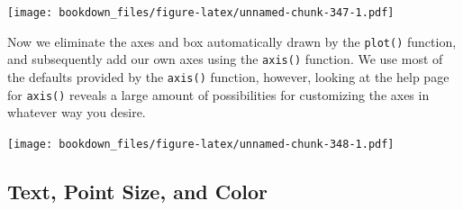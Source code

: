 \documentclass[
]{krantz}
\makeatletter
\newenvironment{Shaded}{\begin{snugshade}}{\end{snugshade}}
\newcommand{\DataTypeTok}[1]{\textcolor[rgb]{0.27,0.27,0.27}{#1}}
\newcommand{\DecValTok}[1]{\textcolor[rgb]{0.06,0.06,0.06}{#1}}
\newcommand{\KeywordTok}[1]{\textcolor[rgb]{0.27,0.27,0.27}{\textbf{#1}}}
\newcommand{\NormalTok}[1]{#1}
\newcommand{\OperatorTok}[1]{\textcolor[rgb]{0.43,0.43,0.43}{\textbf{#1}}}
\newcommand{\OtherTok}[1]{\textcolor[rgb]{0.37,0.37,0.37}{#1}}
\newcommand{\StringTok}[1]{\textcolor[rgb]{0.5,0.5,0.5}{#1}}
\newenvironment{kframe}{%
\medskip{}
\setlength{\fboxsep}{.8em}
 \def\at@end@of@kframe{}%
 \ifinner\ifhmode%
  \def\at@end@of@kframe{\end{minipage}}%
  \begin{minipage}{\columnwidth}%
 \fi\fi%
 \def\FrameCommand##1{\hskip\@totalleftmargin \hskip-\fboxsep
 \colorbox{shadecolor}{##1}\hskip-\fboxsep
     \hskip-\linewidth \hskip-\@totalleftmargin \hskip\columnwidth}%
 \MakeFramed {\advance\hsize-\width
   \@totalleftmargin\z@ \linewidth\hsize
   \@setminipage}}%
 {\par\unskip\endMakeFramed%
 \at@end@of@kframe}
\renewenvironment{Shaded}{\begin{kframe}}{\end{kframe}}
\makeatother
\begin{document}
\texttt{[image: bookdown\_files/figure-latex/unnamed-chunk-347-1.pdf]}

Now we eliminate the axes and box automatically drawn by the \texttt{plot()} function, and subsequently add our own axes using the \texttt{axis()} function. We use most of the defaults provided by the \texttt{axis()} function, however, looking at the help page for \texttt{axis()} reveals a large amount of possibilities for customizing the axes in whatever way you desire.

\begin{Shaded}
\end{Shaded}

\texttt{[image: bookdown\_files/figure-latex/unnamed-chunk-348-1.pdf]}

\hypertarget{text-point-size-and-color-1}{%
\subsection{Text, Point Size, and Color}\label{text-point-size-and-color-1}}
\end{document}

